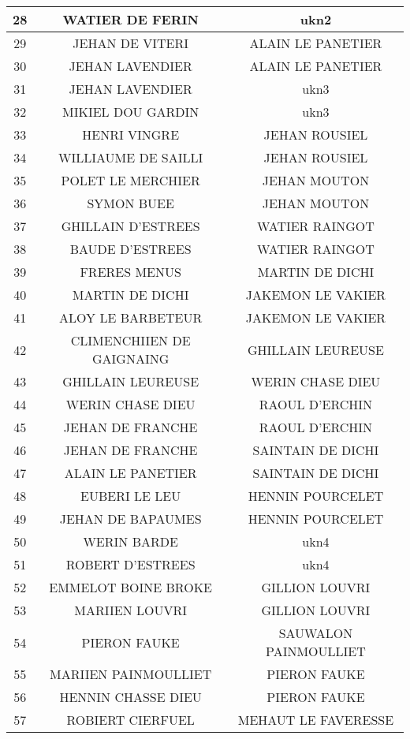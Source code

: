 \begin{center}
\begin{longtable}{|c|c|c|}
\hline	28	&	WATIER DE FERIN	&	ukn2	\\
\hline	29	&	JEHAN DE VITERI	&	ALAIN LE PANETIER	\\
\hline	30	&	JEHAN LAVENDIER	&	ALAIN LE PANETIER	\\
\hline	31	&	JEHAN LAVENDIER	&	ukn3	\\
\hline	32	&	MIKIEL DOU GARDIN	&	ukn3	\\
\hline	33	&	HENRI VINGRE	&	JEHAN ROUSIEL	\\
\hline	34	&	WILLIAUME DE SAILLI	&	JEHAN ROUSIEL	\\
\hline	35	&	POLET LE MERCHIER	&	JEHAN MOUTON	\\
\hline	36	&	SYMON BUEE	&	JEHAN MOUTON	\\
\hline	37	&	GHILLAIN D'ESTREES	&	WATIER RAINGOT	\\
\hline	38	&	BAUDE D'ESTREES	&	WATIER RAINGOT	\\
\hline	39	&	FRERES MENUS	&	MARTIN DE DICHI	\\
\hline	40	&	MARTIN DE DICHI	&	JAKEMON LE VAKIER	\\
\hline	41	&	ALOY LE BARBETEUR	&	JAKEMON LE VAKIER	\\
\hline	42	&	CLIMENCHIIEN DE GAIGNAING	&	GHILLAIN LEUREUSE	\\
\hline	43	&	GHILLAIN LEUREUSE	&	WERIN CHASE DIEU	\\
\hline	44	&	WERIN CHASE DIEU	&	RAOUL D'ERCHIN	\\
\hline	45	&	JEHAN DE FRANCHE	&	RAOUL D'ERCHIN	\\
\hline	46	&	JEHAN DE FRANCHE	&	SAINTAIN DE DICHI	\\
\hline	47	&	ALAIN LE PANETIER	&	SAINTAIN DE DICHI	\\
\hline	48	&	EUBERI LE LEU	&	HENNIN POURCELET	\\
\hline	49	&	JEHAN DE BAPAUMES	&	HENNIN POURCELET	\\
\hline	50	&	WERIN BARDE	&	ukn4	\\
\hline	51	&	ROBERT D'ESTREES	&	ukn4	\\
\hline	52	&	EMMELOT BOINE BROKE	&	GILLION LOUVRI	\\
\hline	53	&	MARIIEN LOUVRI	&	GILLION LOUVRI	\\
\hline	54	&	PIERON FAUKE	&	SAUWALON PAINMOULLIET	\\
\hline	55	&	MARIIEN PAINMOULLIET	&	PIERON FAUKE	\\
\hline	56	&	HENNIN CHASSE DIEU	&	PIERON FAUKE	\\
\hline	57	&	ROBIERT CIERFUEL	&	MEHAUT LE FAVERESSE	\\

\end{longtable}
\end{center}
